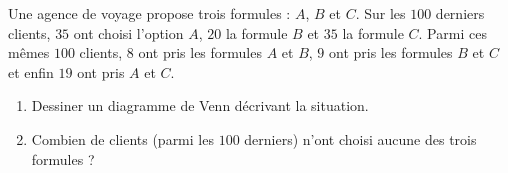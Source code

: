 
\begin{exercice}\label{exosmath-0356}


Une agence de voyage propose trois formules : \( A\), \( B\) et \( C\). Sur les \( 100\) derniers clients, \( 35\) ont choisi l'option \( A\), \( 20\) la formule \( B\) et \( 35\) la formule \( C\). Parmi ces mêmes \( 100\) clients, \( 8\) ont pris les formules \( A\) et \( B\), \( 9\) ont pris les formules \( B\) et \( C\) et enfin \( 19\) ont pris \( A\) et \( C\).

\begin{enumerate}
    \item
        Dessiner un diagramme de Venn décrivant la situation.
    \item
        Combien de clients (parmi les \( 100\) derniers) n'ont choisi aucune des trois formules ?
\end{enumerate}


\end{exercice}
